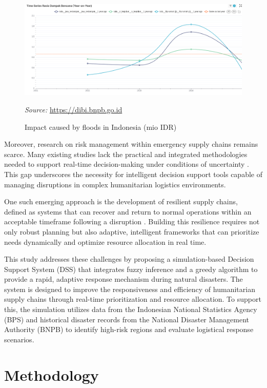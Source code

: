 \documentclass[journal,final,a4paper,twoside,11pt]{IEEEtran}
\begin{document}
\begin{figure}[htbp]
    \centerline{\includegraphics[width=0.8\linewidth]{fig3.png}}
    \caption{Impact caused by floods in Indonesia (mio IDR)}
    \label{fig:floodimpact}
    \vspace{0.2cm}
\footnotesize{\textit{Source:} \url{https://dibi.bnpb.go.id}}
\end{figure}

Moreover, research on risk management within emergency supply chains remains scarce. Many existing studies lack the practical and integrated methodologies needed to support real-time decision-making under conditions of uncertainty \cite{chukwuka2023comprehensive}. This gap underscores the necessity for intelligent decision support tools capable of managing disruptions in complex humanitarian logistics environments.

One such emerging approach is the development of resilient supply chains, defined as systems that can recover and return to normal operations within an acceptable timeframe following a disruption \cite{orengo2022food}. Building this resilience requires not only robust planning but also adaptive, intelligent frameworks that can prioritize needs dynamically and optimize resource allocation in real time.

This study addresses these challenges by proposing a simulation-based Decision Support System (DSS) that integrates fuzzy inference and a greedy algorithm to provide a rapid, adaptive response mechanism during natural disasters. The system is designed to improve the responsiveness and efficiency of humanitarian supply chains through real-time prioritization and resource allocation. To support this, the simulation utilizes data from the Indonesian National Statistics Agency (BPS) and historical disaster records from the National Disaster Management Authority (BNPB) to identify high-risk regions and evaluate logistical response scenarios.



\section{Methodology}
\end{document}

